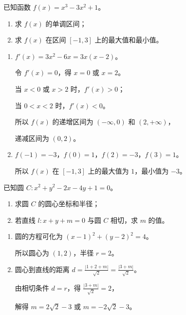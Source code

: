\documentclass{exam-zh}
\begin{document}
\begin{problem}[points = 12]
  已知函数 $f(x) = x^3 - 3x^2 + 1$。

  \begin{enumerate}
    \item 求 $f(x)$ 的单调区间；
    \item 求 $f(x)$ 在区间 $[-1, 3]$ 上的最大值和最小值。
  \end{enumerate}

  \begin{solution}
    \begin{enumerate}
      \item $f'(x) = 3x^2 - 6x = 3x(x - 2)$。

      令 $f'(x) = 0$，得 $x = 0$ 或 $x = 2$。

      当 $x < 0$ 或 $x > 2$ 时，$f'(x) > 0$；

      当 $0 < x < 2$ 时，$f'(x) < 0$。

      所以 $f(x)$ 的递增区间为 $(-\infty, 0)$ 和 $(2, +\infty)$，

      递减区间为 $(0, 2)$。

      \item $f(-1) = -3$，$f(0) = 1$，$f(2) = -3$，$f(3) = 1$。

      所以 $f(x)$ 在 $[-1, 3]$ 上的最大值为 $1$，最小值为 $-3$。
    \end{enumerate}
  \end{solution}
\end{problem}

\begin{problem}[points = 12]
  已知圆 $C: x^2 + y^2 - 2x - 4y + 1 = 0$。

  \begin{enumerate}
    \item 求圆 $C$ 的圆心坐标和半径；
    \item 若直线 $l: x + y + m = 0$ 与圆 $C$ 相切，求 $m$ 的值。
  \end{enumerate}

  \begin{solution}
    \begin{enumerate}
      \item 圆的方程可化为 $(x - 1)^2 + (y - 2)^2 = 4$。

      所以圆心为 $(1, 2)$，半径 $r = 2$。

      \item 圆心到直线的距离 $d = \frac{|1 + 2 + m|}{\sqrt{2}} = \frac{|3 + m|}{\sqrt{2}}$。

      由相切条件 $d = r$，得 $\frac{|3 + m|}{\sqrt{2}} = 2$，

      解得 $m = 2\sqrt{2} - 3$ 或 $m = -2\sqrt{2} - 3$。
    \end{enumerate}
  \end{solution}
\end{problem}
\end{document}
